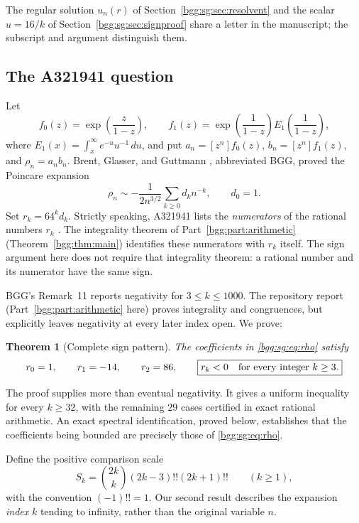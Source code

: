 \documentclass[11pt,a4paper]{article}
\numberwithin{equation}{section}
\newtheorem{theorem}{Theorem}[section]
\theoremstyle{definition}
\theoremstyle{remark}
\theoremstyle{definition}
\begin{document}
The regular solution $u_n(r)$ of Section~\ref{bgg:sg:sec:resolvent} and the
scalar $u=16/k$ of Section~\ref{bgg:sg:sec:signproof} share a letter in
the manuscript; the subscript and argument distinguish them.

\subsection{The A321941 question}

Let
\[
 f_0(z)=\exp\!\left(\frac{z}{1-z}\right),\qquad
 f_1(z)=\exp\!\left(\frac1{1-z}\right)
                E_1\!\left(\frac1{1-z}\right),
\]
where \(E_1(x)=\int_x^\infty e^{-u}u^{-1}\,du\), and put
\(a_n=[z^n]f_0(z)\), \(b_n=[z^n]f_1(z)\), and
\(\rho_n=a_nb_n\).
Brent, Glasser, and Guttmann \cite{BGG}, abbreviated BGG, proved the
Poincare expansion
\begin{equation}\label{bgg:sg:eq:rho}
 \rho_n\sim-\frac1{2n^{3/2}}\sum_{k\ge0}d_kn^{-k},
 \qquad d_0=1.
\end{equation}
Set \(r_k=64^kd_k\).  Strictly speaking, A321941 lists the
\emph{numerators} of the rational numbers \(r_k\)
\cite{oeis321941}.  The integrality theorem of Part~\ref{bgg:part:arithmetic}
(Theorem~\ref{bgg:thm:main}) identifies
these numerators with \(r_k\) itself.  The sign argument here does not
require that integrality theorem: a rational number and its numerator
have the same sign.

BGG's Remark~11 reports negativity for \(3\le k\le1000\).
The repository report (Part~\ref{bgg:part:arithmetic} here) proves
integrality and congruences, but explicitly
leaves negativity at every later index open.  We prove:

\begin{theorem}[Complete sign pattern]\label{bgg:sg:thm:sign}
The coefficients in \eqref{bgg:sg:eq:rho} satisfy
\[
 r_0=1,\qquad r_1=-14,\qquad r_2=86,\qquad
 \boxed{r_k<0\quad\hbox{for every integer }k\ge3.}
\]
\end{theorem}

The proof supplies more than eventual negativity.  It gives a uniform
inequality for every \(k\ge32\), with the remaining \(29\) cases
certified in exact rational arithmetic.  An exact spectral
identification, proved below, establishes that the coefficients being
bounded are precisely those of \eqref{bgg:sg:eq:rho}.

Define the positive comparison scale
\begin{equation}\label{bgg:sg:eq:Sk}
 S_k=\binom{2k}{k}(2k-3)!!(2k+1)!!\qquad(k\ge1),
\end{equation}
with the convention \((-1)!!=1\).
Our second result describes the expansion \emph{index} \(k\) tending
to infinity, rather than the original variable \(n\).
\end{document}
